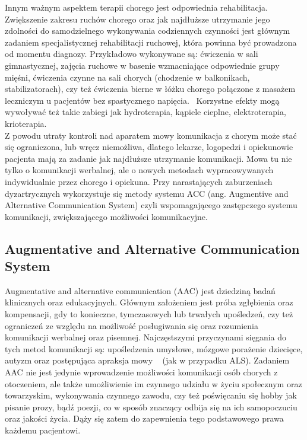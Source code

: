 \documentclass[twoside,a4paper]{book}
\begin{document}
Innym ważnym aspektem terapii chorego jest odpowiednia rehabilitacja. Zwiększenie zakresu ruchów chorego oraz jak najdłuższe utrzymanie jego zdolności do samodzielnego wykonywania codziennych czynności jest głównym zadaniem specjalistycznej rehabilitacji ruchowej, która powinna być prowadzona od momentu diagnozy. Przykładowo wykonywane są: ćwiczenia w sali gimnastycznej, zajęcia ruchowe w basenie wzmacniające odpowiednie grupy mięśni, ćwiczenia czynne na sali chorych (chodzenie w balkonikach, stabilizatorach), czy też ćwiczenia bierne w łóżku chorego połączone z masażem leczniczym u pacjentów bez spastycznego napięcia.~\cite{alsAdamek} Korzystne efekty mogą wywoływać też takie zabiegi jak hydroterapia, kąpiele cieplne, elektroterapia, krioterapia. ~\cite{poradnik}\\
Z powodu utraty kontroli nad aparatem mowy komunikacja z chorym może stać się ograniczona, lub wręcz niemożliwa, dlatego lekarze, logopedzi i opiekunowie pacjenta mają za zadanie jak najdłuższe utrzymanie komunikacji.  Mowa tu nie tylko o komunikacji werbalnej, ale o nowych metodach wypracowywanych  indywidualnie przez chorego i opiekuna. 
Przy  narastających  zaburzeniach  dyzartrycznych  wykorzystuje  się metody  systemu  ACC  (ang.  Augmentive  and  Alternative  Communication  System)  czyli  wspomagającego  zastępczego  systemu  komunikacji,  zwiększającego możliwości komunikacyjne.~\cite{alsAdamek}

\subsection{Augmentative and Alternative Communication System}


Augmentative and alternative communication (AAC) jest dziedziną badań klinicznych oraz edukacyjnych. Głównym założeniem jest próba zgłębienia oraz kompensacji, gdy to konieczne, tymczasowych lub trwałych upośledzeń, czy też ograniczeń ze względu na możliwość posługiwania się oraz rozumienia komunikacji werbalnej oraz pisemnej.  Najczęstszymi przyczynami sięgania do tych metod komunikacji są: upośledzenia umysłowe, mózgowe porażenie dziecięce, autyzm oraz postępująca apraksja mowy ~\cite{augmentative} (jak w przypadku ALS). Zadaniem AAC nie jest jedynie wprowadzenie możliwości komunikacji osób chorych z otoczeniem, ale także umożliwienie im czynnego udziału w życiu społecznym oraz towarzyskim, wykonywania czynnego zawodu, czy też poświęcaniu się hobby jak pisanie prozy, bądź poezji, co w sposób znaczący odbija się na ich samopoczuciu oraz jakości życia. Dąży się zatem do zapewnienia tego podstawowego prawa każdemu pacjentowi. 
\end{document}
